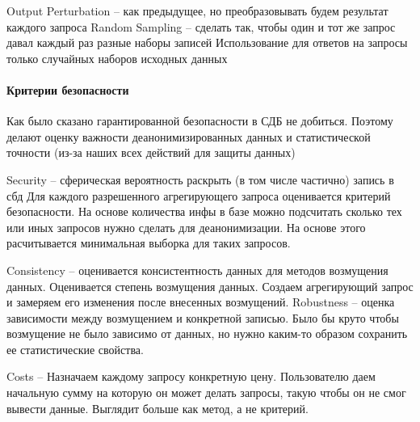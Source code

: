 Output Perturbation -- как предыдущее, но преобразовывать будем результат каждого запроса
Random Sampling -- сделать так, чтобы один и тот же запрос давал каждый раз разные наборы записей
Использование для ответов на запросы только случайных наборов исходных данных

\paragraph{Критерии безопасности}
Как было сказано гарантированной безопасности в СДБ не добиться. Поэтому делают оценку важности деанонимизированных данных и статистической точности (из-за наших всех действий для защиты данных)

Security -- сферическая вероятность раскрыть (в том числе частично) запись в сбд
Для каждого разрешенного агрегирующего запроса оценивается критерий безопасности. На основе количества инфы в базе можно подсчитать сколько тех или иных запросов нужно сделать для деанонимизации. На основе этого расчитывается минимальная выборка для таких запросов.

Consistency -- оценивается консистентность данных для методов возмущения данных. Оценивается степень возмущения данных. Создаем агрегирующий запрос и замеряем его изменения после внесенных возмущений.
Robustness -- оценка зависимости между возмущением и конкретной записью. Было бы круто чтобы возмущение не было зависимо от данных, но нужно каким-то образом сохранить ее статистические свойства.

Costs -- Назначаем каждому запросу конкретную цену. Пользователю даем начальную сумму на которую он может делать запросы, такую чтобы он не смог вывести данные. Выглядит больше как метод, а не критерий.
